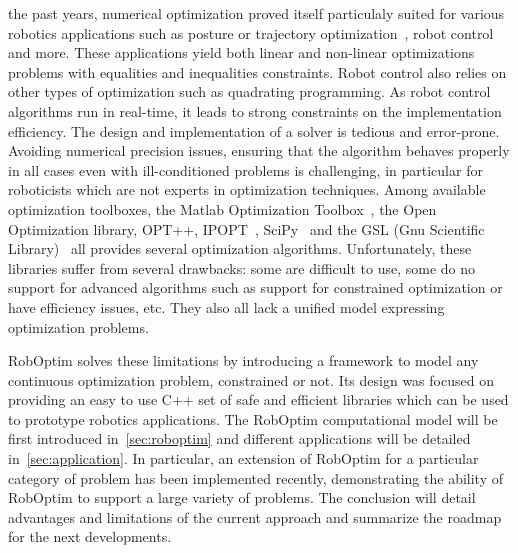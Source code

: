 \documentclass[conference,final,a4paper,twocolumn,9pt]{IEEEtran}
\begin{document}
 the past years, numerical optimization proved
itself particulaly suited for various robotics applications such as
posture or trajectory optimization~\cite{miossec06,saab-tro-12}, robot
control~\cite{mansard-icra-12} and more. These applications yield both
linear and non-linear optimizations problems with equalities and
inequalities constraints. Robot control also relies on other types of
optimization such as quadrating programming. As robot control
algorithms run in real-time, it leads to strong constraints on the
implementation efficiency. The design and implementation of a solver
is tedious and error-prone. Avoiding numerical precision issues,
ensuring that the algorithm behaves properly in all cases even with
ill-conditioned problems is challenging, in particular for roboticists
which are not experts in optimization techniques. Among available
optimization toolboxes, the Matlab Optimization Toolbox~\cite{matlab},
the Open Optimization library, OPT++, IPOPT~\cite{ipopt},
SciPy~\cite{scipy} and the GSL (Gnu Scientific Library)~\cite{gsl} all
provides several optimization algorithms. Unfortunately, these
libraries suffer from several drawbacks: some are difficult to use,
some do no support for advanced algorithms such as support for
constrained optimization or have efficiency issues, etc. They also all
lack a unified model expressing optimization problems.


RobOptim solves these limitations by introducing a framework to model
any continuous optimization problem, constrained or not. Its design
was focused on providing an easy to use C++ set of safe and efficient
libraries which can be used to prototype robotics applications. The
RobOptim computational model will be first introduced
in~\autoref{sec:roboptim} and different applications will be detailed
in~\autoref{sec:application}. In particular, an extension of RobOptim
for a particular category of problem has been implemented recently,
demonstrating the ability of RobOptim to support a large variety of
problems. The conclusion will detail advantages and limitations of the
current approach and summarize the roadmap for the next developments.
\end{document}
